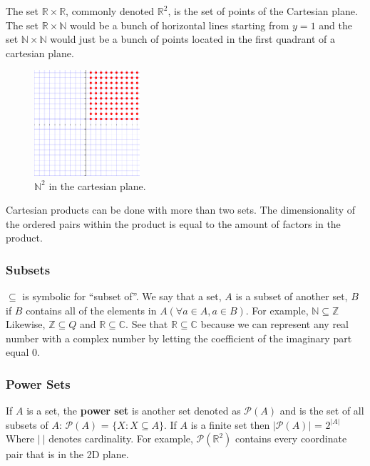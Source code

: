 \documentclass[12pt]{report}
\begin{document}
The set $\mathbb R \times \mathbb R$, commonly denoted $\mathbb{R}^2$, is the set of points of the Cartesian plane. The set $\mathbb R \times \mathbb N$ would be a bunch of horizontal lines starting from $y=1$ and the set $\mathbb N \times \mathbb N$ would just be a bunch of points located in the first quadrant of a cartesian plane.
\begin{figure}[h]
    \centering
    \includegraphics[width=0.35\textwidth]{nxn.pdf}
    \caption{$\mathbb{N}^2$ in the cartesian plane.}
\end{figure}

Cartesian products can be done with more than two sets. The dimensionality of the ordered pairs within the product is equal to the amount of factors in the product.

\subsubsection{Subsets}

\hspace{\parindent}$\subseteq$ is symbolic for ``subset of''. We say that a set, $A$ is a subset of another set, $B$ if $B$ contains all of the elements in $A$\hspace{5pt}$(\forall a \in A, a \in B)$. For example, $\mathbb{N} \subseteq \mathbb{Z}$ Likewise, $\mathbb{Z} \subseteq {Q}$ and $\mathbb{R} \subseteq \mathbb{C}$. See that $\mathbb{R} \subseteq \mathbb{C}$ because we can represent any real number with a complex number by letting the coefficient of the imaginary part equal $0$.

\subsubsection{Power Sets}

\hspace{\parindent}If $A$ is a set, the \textbf{power set} is another set denoted as $\mathscr{P}(A)$ and is the set of all subsets of $A$: $\mathscr{P}(A)$ = $\{X: X \subseteq A\}$. If $A$ is a finite set then $|\mathscr{P}(A)|$ = $2^{|A|}$ Where $|~|$ denotes cardinality. For example, $\mathscr{P}(\mathbb{R}^{2})$ contains every coordinate pair that is in the 2D plane.
\end{document}
